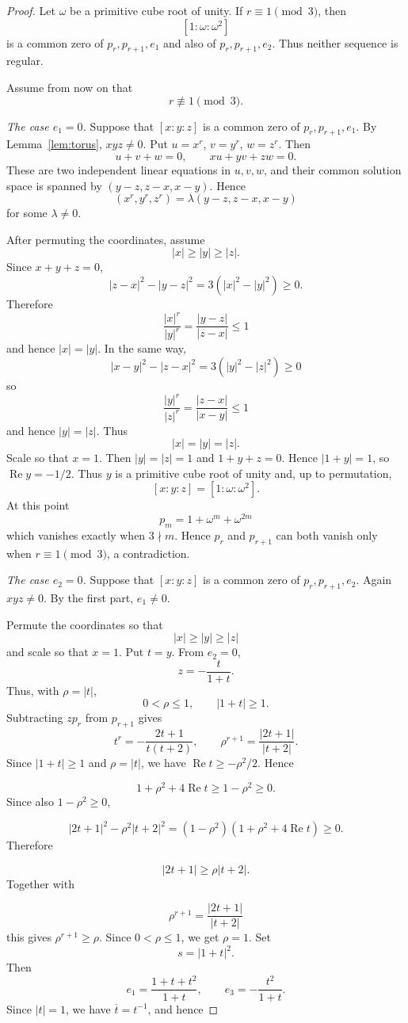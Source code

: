 \documentclass[preprint,12pt]{elsarticle}
\begin{document}
\begin{proof}
Let $\omega$ be a primitive cube root of unity. If $r\equiv1\pmod3$, then
$$
[1:\omega:\omega^2]
$$
is a common zero of $p_r,p_{r+1},e_1$ and also of $p_r,p_{r+1},e_2$.
Thus neither sequence is regular.

Assume from now on that
$$
r\not\equiv1\pmod3.
$$

\smallskip
\noindent\emph{The case $e_1=0$.}
Suppose that $[x:y:z]$ is a common zero of $p_r,p_{r+1},e_1$. By
Lemma~\ref{lem:torus}, $xyz\neq0$. Put $u=x^r$, $v=y^r$, $w=z^r$. Then
$$
u+v+w=0,\qquad xu+yv+zw=0.
$$
These are two independent linear equations in $u,v,w$, and their common
solution space is spanned by $(y-z,z-x,x-y)$. Hence
$$
(x^r,y^r,z^r)=\lambda(y-z,z-x,x-y)
$$
for some $\lambda\neq0$.

After permuting the coordinates, assume
$$
|x|\geq|y|\geq|z|.
$$
Since $x+y+z=0$,
$$
|z-x|^2-|y-z|^2=3(|x|^2-|y|^2)\geq0.
$$
Therefore
$$
\frac{|x|^r}{|y|^r}=\frac{|y-z|}{|z-x|}\leq1
$$
and hence $|x|=|y|$. In the same way,
$$
|x-y|^2-|z-x|^2=3(|y|^2-|z|^2)\geq0
$$
so
$$
\frac{|y|^r}{|z|^r}=\frac{|z-x|}{|x-y|}\leq1
$$
and hence $|y|=|z|$. Thus
$$
|x|=|y|=|z|.
$$
Scale so that $x=1$. Then $|y|=|z|=1$ and $1+y+z=0$. Hence
$|1+y|=1$, so $\operatorname{Re}y=-1/2$. Thus $y$ is a primitive cube root
of unity and, up to permutation,
$$
[x:y:z]=[1:\omega:\omega^2].
$$
At this point
$$
p_m=1+\omega^m+\omega^{2m}
$$
which vanishes exactly when $3\nmid m$. Hence $p_r$ and $p_{r+1}$ can both
vanish only when $r\equiv1\pmod3$, a contradiction.

\smallskip
\noindent\emph{The case $e_2=0$.}
Suppose that $[x:y:z]$ is a common zero of $p_r,p_{r+1},e_2$. Again
$xyz\neq0$. By the first part, $e_1\neq0$.

Permute the coordinates so that
$$
|x|\geq|y|\geq|z|
$$
and scale so that $x=1$. Put $t=y$. From $e_2=0$,
$$
z=-\frac{t}{1+t}.
$$
Thus, with $\rho=|t|$,
$$
0<\rho\leq1,\qquad |1+t|\geq1.
$$
Subtracting $zp_r$ from $p_{r+1}$ gives
$$
t^r=-\frac{2t+1}{t(t+2)},\qquad
\rho^{r+1}=\frac{|2t+1|}{|t+2|}.
$$
Since $|1+t|\geq1$ and $\rho=|t|$, we have
$\operatorname{Re}t\geq-\rho^2/2$. Hence

$$
1+\rho^2+4\operatorname{Re}t
\geq1-\rho^2\geq0.
$$
Since also $1-\rho^2\geq0$,

$$
|2t+1|^2-\rho^2|t+2|^2
=(1-\rho^2)(1+\rho^2+4\operatorname{Re}t)\geq0.
$$
Therefore

$$
|2t+1|\geq\rho|t+2|.
$$
Together with

$$
\rho^{r+1}=\frac{|2t+1|}{|t+2|}
$$
this gives $\rho^{r+1}\geq\rho$. Since $0<\rho\leq1$, we get
$\rho=1$.
Set
$$
s=|1+t|^2.
$$
Then
$$
e_1=\frac{1+t+t^2}{1+t},\qquad e_3=-\frac{t^2}{1+t}.
$$
Since $|t|=1$, we have $\overline t=t^{-1}$, and hence


\end{proof}
\end{document}
